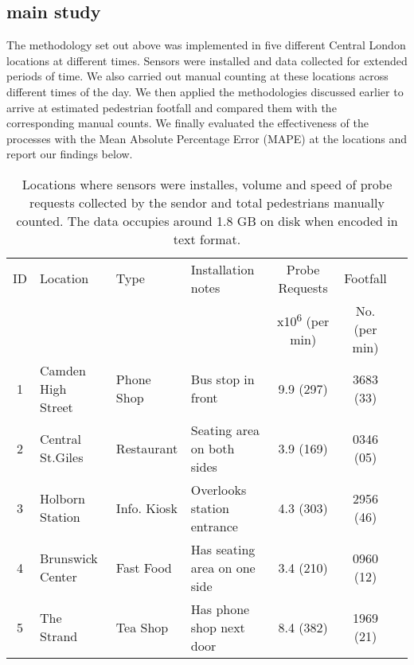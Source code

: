 \subsection{main study}

The methodology set out above was implemented in five different Central London locations at different times. Sensors were installed and data collected for extended periods of time. We also carried out manual counting at these locations across different times of the day. We then applied the methodologies discussed earlier to arrive at estimated pedestrian footfall and compared them with the corresponding manual counts.  We finally evaluated the effectiveness of the processes with the Mean Absolute Percentage Error (MAPE) at the locations and report our findings below.  

\begin{table}
    \caption{Locations where sensors were installes, volume and speed of probe requests collected by
    the sendor and total pedestrians manually counted. The data occupies around 1.8 GB on disk 
    when encoded in text format.}
	{\begin{tabular}{clllccc} 
		\toprule
         ID & Location & Type & Installation notes & Probe Requests & Footfall\\
         & & & & x10\textsuperscript{6} (per min) & No. (per min)\\
		 \midrule
         1 & Camden High Street & Phone Shop & Bus stop in front & 9.9 (297) & 3683 (33)\\
         2 & Central St.Giles & Restaurant & Seating area on both sides & 3.9 (169) & 0346 (05)\\
         3 & Holborn Station & Info. Kiosk & Overlooks station entrance & 4.3 (303) & 2956 (46)\\
         4 & Brunswick Center & Fast Food & Has seating area on one side & 3.4 (210) & 0960 (12)\\
         5 & The Strand & Tea Shop & Has phone shop next door & 8.4 (382) & 1969 (21)\\
		 \bottomrule
	\end{tabular}}
	\label{locations-table}
\end{table}


